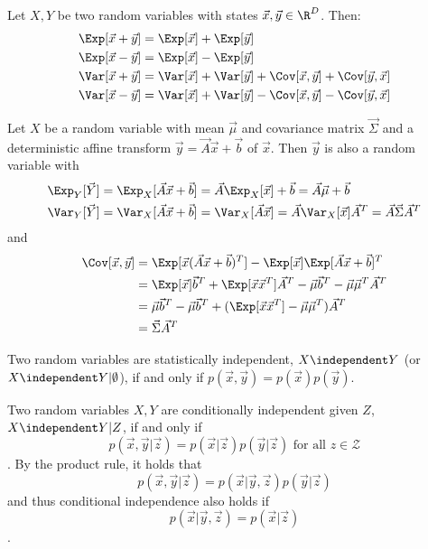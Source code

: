 Let $X, Y$ be two random variables with states
$\vec{x}, \vec{y} \in \R^D$.
Then:
\begin{align*}
    \Exp[\vec{x} + \vec{y}] &= \Exp[\vec{x}] + \Exp[\vec{y}] \\
    \Exp[\vec{x} - \vec{y}] &= \Exp[\vec{x}] - \Exp[\vec{y}] \\
    \Var[\vec{x} + \vec{y}] &= \Var[\vec{x}] + \Var[\vec{y}] + \Cov[\vec{x}, \vec{y}] + \Cov[\vec{y}, \vec{x}] \\
    \Var[\vec{x} - \vec{y}] &= \Var[\vec{x}] + \Var[\vec{y}] - \Cov[\vec{x}, \vec{y}] - \Cov[\vec{y}, \vec{x}]
\end{align*}

Let $X$ be a random variable with mean $\vec{\mu}$ and
covariance matrix $\vec{\Sigma}$ and a deterministic affine
transform $\vec{y} = \vec{A} \vec{x} + \vec{b}$ of $\vec{x}$.
Then $\vec{y}$ is also a random variable with
\begin{align*}
    \Exp_Y[\vec{Y}] &=
        \Exp_X[\vec{A} \vec{x} + \vec{b}] =
        \vec{A} \Exp_X[\vec{x}] + \vec{b} =
        \vec{A} \vec{\mu} + \vec{b} \\
    \Var_Y[\vec{Y}] &=
        \Var_X[\vec{A} \vec{x} + \vec{b}] =
        \Var_X[\vec{A} \vec{x}] =
        \vec{A} \Var_X[\vec{x}] \vec{A}^T =
        \vec{A} \vec{\Sigma} \vec{A}^T
\end{align*}
and
\begin{align*}
    \Cov[\vec{x}, \vec{y}] &=
        \Exp[\vec{x}(\vec{A} \vec{x} + \vec{b})^T]
        - \Exp[\vec{x}]\Exp[\vec{A} \vec{x} + \vec{b}]^T \\
    &= \Exp[\vec{x}]\vec{b}^T + \Exp[\vec{x}\vec{x}^T]\vec{A}^T - \vec{\mu}\vec{b}^T - \vec{\mu}\vec{\mu}^T\vec{A}^T \\
    &= \vec{\mu}\vec{b}^T - \vec{\mu}\vec{b}^T + (\Exp[\vec{x}\vec{x}^T] - \vec{\mu}\vec{\mu}^T)\vec{A}^T \\
    &= \vec{\Sigma}\vec{A}^T
\end{align*}

Two random variables are statistically independent,
$X \independent Y$ (or $X \independent Y | \emptyset$),
if and only if
$p(\vec{x}, \vec{y}) = p(\vec{x}) p(\vec{y})$.

Two random variables $X, Y$ are conditionally independent given $Z$,
$X \independent Y | Z$,
if and only if
\begin{equation*}
    p(\vec{x}, \vec{y} | \vec{z}) = p(\vec{x} | \vec{z}) p(\vec{y} | \vec{z}) \text{ for all $z \in \mathcal{Z}$}
\end{equation*}.
By the product rule, it holds that
\begin{equation*}
    p(\vec{x}, \vec{y} | \vec{z})
    = p(\vec{x} | \vec{y}, \vec{z}) p(\vec{y} | \vec{z})
\end{equation*}
and thus conditional independence also holds if
\begin{equation*}
    p(\vec{x} | \vec{y}, \vec{z}) = p(\vec{x} | \vec{z})
\end{equation*}.


